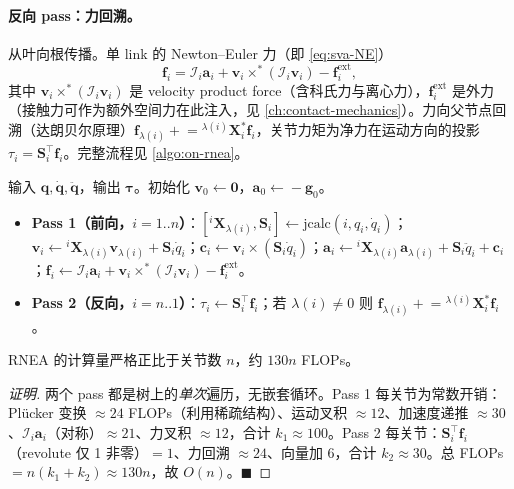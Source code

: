 \paragraph{反向 pass：力回溯。}
从叶向根传播。单 link 的 Newton--Euler 力（即 \cref{eq:sva-NE}）
\begin{equation}
  \mathbf f_i=\mathcal I_i\mathbf a_i+\mathbf v_i\times^*(\mathcal I_i\mathbf v_i)-\mathbf f_i^{\text{ext}},
  \label{eq:on-frec}
\end{equation}
其中 $\mathbf v_i\times^*(\mathcal I_i\mathbf v_i)$ 是 velocity product force（含科氏力与离心力），$\mathbf f_i^{\text{ext}}$ 是外力（接触力可作为额外空间力在此注入，见 \cref{ch:contact-mechanics}）。力向父节点回溯（达朗贝尔原理）$\mathbf f_{\lambda(i)}\mathrel{+}={}^{\lambda(i)}\mathbf X_i^*\mathbf f_i$，关节力矩为净力在运动方向的投影 $\tau_i=\mathbf S_i^\top\mathbf f_i$。完整流程见 \cref{algo:on-rnea}。

\begin{algo}\label{algo:on-rnea}
输入 $\mathbf q,\dot{\mathbf q},\ddot{\mathbf q}$，输出 $\boldsymbol\tau$。初始化 $\mathbf v_0\!\leftarrow\!\mathbf 0$，$\mathbf a_0\!\leftarrow\!-\mathbf g_0$。
\begin{itemize}
  \item \textbf{Pass 1（前向，$i=1..n$）}：$[{}^i\mathbf X_{\lambda(i)},\mathbf S_i]\!\leftarrow\!\mathrm{jcalc}(i,q_i,\dot q_i)$；$\mathbf v_i\!\leftarrow\!{}^i\mathbf X_{\lambda(i)}\mathbf v_{\lambda(i)}+\mathbf S_i\dot q_i$；$\mathbf c_i\!\leftarrow\!\mathbf v_i\times(\mathbf S_i\dot q_i)$；$\mathbf a_i\!\leftarrow\!{}^i\mathbf X_{\lambda(i)}\mathbf a_{\lambda(i)}+\mathbf S_i\ddot q_i+\mathbf c_i$；$\mathbf f_i\!\leftarrow\!\mathcal I_i\mathbf a_i+\mathbf v_i\times^*(\mathcal I_i\mathbf v_i)-\mathbf f_i^{\text{ext}}$。
  \item \textbf{Pass 2（反向，$i=n..1$）}：$\tau_i\!\leftarrow\!\mathbf S_i^\top\mathbf f_i$；若 $\lambda(i)\neq0$ 则 $\mathbf f_{\lambda(i)}\mathrel{+}={}^{\lambda(i)}\mathbf X_i^*\mathbf f_i$。
\end{itemize}
\end{algo}

\begin{theorem}\label{thm:on-rnea-complexity}
RNEA 的计算量严格正比于关节数 $n$，约 $130n$ FLOPs。
\end{theorem}
\begin{proof}[证明]
两个 pass 都是树上的\emph{单次}遍历，无嵌套循环。Pass 1 每关节为常数开销：Plücker 变换 $\approx24$ FLOPs（利用稀疏结构）、运动叉积 $\approx12$、加速度递推 $\approx30$、$\mathcal I_i\mathbf a_i$（对称）$\approx21$、力叉积 $\approx12$，合计 $k_1\approx100$。Pass 2 每关节：$\mathbf S_i^\top\mathbf f_i$（revolute 仅 1 非零）$=1$、力回溯 $\approx24$、向量加 $6$，合计 $k_2\approx30$。总 FLOPs $=n(k_1+k_2)\approx130n$，故 $O(n)$。$\blacksquare$
\end{proof}

